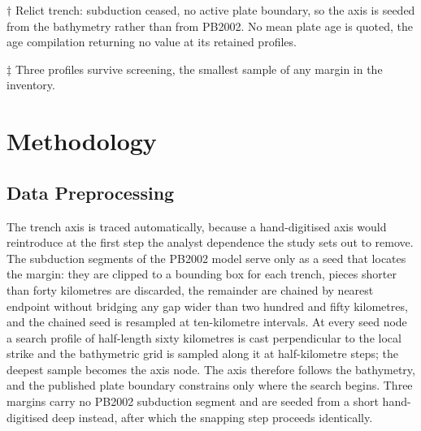 \documentclass[final]{agujournal2019}
\begin{document}
\begin{table}
  \vspace{2pt}
  {\footnotesize\raggedright
    $\dagger$ Relict trench: subduction ceased, no active plate boundary, so
    the axis is seeded from the bathymetry rather than from PB2002. No mean
    plate age is quoted, the age compilation returning no value at its
    retained profiles.\par
    $\ddagger$ Three profiles survive screening, the smallest sample of any
    margin in the inventory.\par}
\end{table}

\section{Methodology}\label{sec:methods}

\subsection{Data Preprocessing}\label{sec:preprocessing}

The trench axis is traced automatically, because a hand-digitised axis would
reintroduce at the first step the analyst dependence the study sets out to
remove. The subduction segments of the PB2002 model \cite{Bird2003} serve only
as a seed that locates the margin: they are clipped to a bounding box for each
trench, pieces shorter than forty kilometres are discarded, the remainder are
chained by nearest endpoint without bridging any gap wider than two hundred and
fifty kilometres, and the chained seed is resampled at ten-kilometre intervals.
At every seed node a search profile of half-length sixty kilometres is cast
perpendicular to the local strike and the bathymetric grid is sampled along it
at half-kilometre steps; the deepest sample becomes the axis node. The axis
therefore follows the bathymetry, and the published plate boundary constrains
only where the search begins. Three margins carry no PB2002 subduction segment
and are seeded from a short hand-digitised deep instead, after which the
snapping step proceeds identically.
\end{document}
